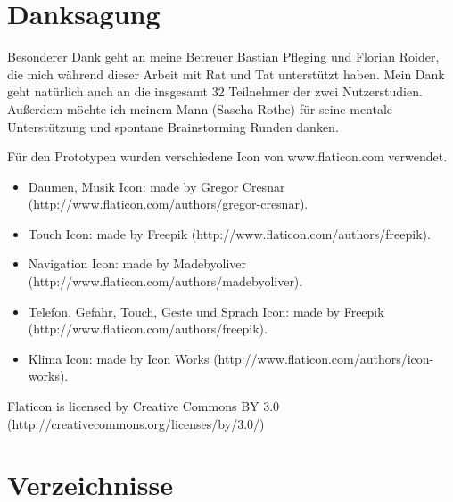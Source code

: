 \documentclass[11pt,a4paper,twoside]{book}
\begin{document}


\chapter{Danksagung}\label{cha:Danksagung}

Besonderer Dank geht an meine Betreuer Bastian Pfleging und Florian Roider, die mich während dieser Arbeit mit Rat und Tat unterstützt haben. Mein Dank geht natürlich auch an die insgesamt 32 Teilnehmer der zwei Nutzerstudien. Außerdem möchte ich meinem Mann (Sascha Rothe) für seine mentale Unterstützung und spontane Brainstorming Runden danken. 

Für den Prototypen wurden verschiedene Icon von www.flaticon.com verwendet. 
\begin{itemize}
	\item Daumen, Musik Icon: made by Gregor Cresnar (http://www.flaticon.com/authors/gregor-cresnar).
	\item Touch Icon: made by Freepik (http://www.flaticon.com/authors/freepik).
	\item Navigation Icon: made by Madebyoliver (http://www.flaticon.com/authors/madebyoliver). 
	\item Telefon, Gefahr, Touch, Geste und Sprach Icon: made by Freepik (http://www.flaticon.com/authors/freepik). 
	\item Klima Icon: made by Icon Works (http://www.flaticon.com/authors/icon-works). 
\end{itemize}
Flaticon is licensed by Creative Commons BY 3.0 (http://creativecommons.org/licenses/by/3.0/)

 

\chapter{Verzeichnisse}\label{cha:Verzeichnisse}
\begingroup
\renewcommand{\cleardoublepage}{}
\renewcommand{\clearpage}{}




\endgroup
{}
\listoffigures%

\listoftables%


\fancyhead[LE,RO,LO,RE]{} %
\end{document}
